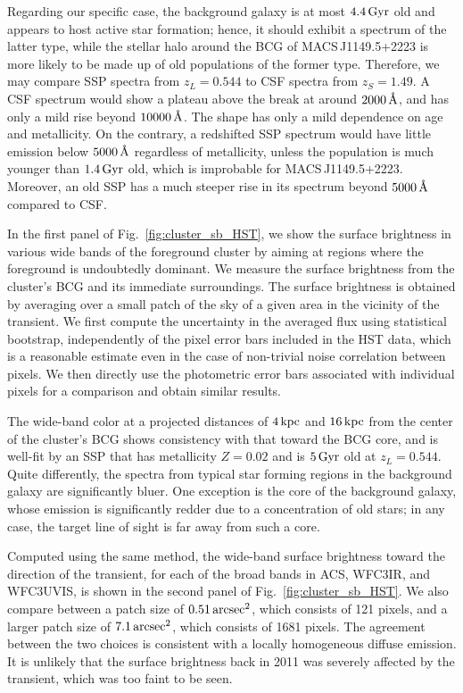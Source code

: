 \documentclass{aastex6}
\newcommand{\reffig}[1]{Fig.~\ref{fig:#1}}
\newcommand{\angstrom}{\mbox{\normalfont\AA}}
\begin{document}
Regarding our specific case, the background galaxy is at most $4.4\,{\rm Gyr}$ old and appears to host active star formation; hence, it should exhibit a spectrum of the latter type, while the stellar halo around the BCG of MACS\,J1149.5+2223 is more likely to be made up of old populations of the former type. Therefore, we may compare SSP spectra from $z_L=0.544$ to CSF spectra from $z_S=1.49$. A CSF spectrum would show a plateau above the break at around $2000\,\angstrom$, and has only a mild rise beyond $10000\,\angstrom$. The shape has only a mild dependence on age and metallicity. On the contrary, a redshifted SSP spectrum would have little emission below $5000\,\angstrom$ regardless of metallicity, unless the population is much younger than $1.4\,{\rm Gyr}$ old, which is improbable for MACS\,J1149.5+2223. Moreover, an old SSP has a much steeper rise in its spectrum beyond $5000\,\angstrom$ compared to CSF.

In the first panel of \reffig{cluster_sb_HST}, we show the surface brightness in various wide bands of the foreground cluster by aiming at regions where the foreground is undoubtedly dominant. We measure the surface brightness from the cluster's BCG and its immediate surroundings. The surface brightness is obtained by averaging over a small patch of the sky of a given area in the vicinity of the transient. We first compute the uncertainty in the averaged flux using statistical bootstrap, independently of the pixel error bars included in the HST data, which is a reasonable estimate even in the case of non-trivial noise correlation between pixels. We then directly use the photometric error bars associated with individual pixels for a comparison and obtain similar results. 

The wide-band color at a projected distances of $4\,{\rm kpc}$ and $16\,{\rm kpc}$ from the center of the cluster's BCG shows consistency with that toward the BCG core, and is well-fit by an SSP that has metallicity $Z=0.02$ and is $5\,{\rm Gyr}$ old at $z_L=0.544$. Quite differently, the spectra from typical star forming regions in the background galaxy are significantly bluer. One exception is the core of the background galaxy, whose emission is significantly redder due to a concentration of old stars; in any case, the target line of sight is far away from such a core.


Computed using the same method, the wide-band surface brightness toward the direction of the transient, for each of the broad bands in ACS, WFC3IR, and WFC3UVIS, is shown in the second panel of \reffig{cluster_sb_HST}. We also compare between a patch size of $0.51\,{\rm arcsec}^2$, which consists of 121 pixels, and a larger patch size of $7.1\,{\rm arcsec}^2$, which consists of 1681 pixels. The agreement between the two choices is consistent with a locally homogeneous diffuse emission. It is unlikely that the surface brightness back in 2011 was severely affected by the transient, which was too faint to be seen.
\end{document}
